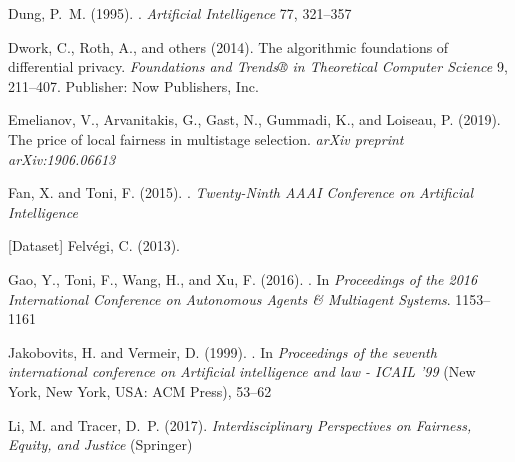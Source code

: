 \documentclass[acmsmall]{custom-arxiv}  %
\begin{document}
\begin{thebibliography}{41}
Dung, P.~M. (1995).
.
\newblock \emph{Artificial Intelligence} 77, 321--357

Dwork, C., Roth, A., and {others} (2014).
\newblock The algorithmic foundations of differential privacy.
\newblock \emph{Foundations and Trends® in Theoretical Computer Science} 9,
  211--407.
\newblock Publisher: Now Publishers, Inc.

Emelianov, V., Arvanitakis, G., Gast, N., Gummadi, K., and Loiseau, P. (2019).
\newblock The price of local fairness in multistage selection.
\newblock \emph{arXiv preprint arXiv:1906.06613}

Fan, X. and Toni, F. (2015).
.
\newblock \emph{Twenty-Ninth AAAI Conference on Artificial Intelligence}

[Dataset] Felv{\'{e}}gi, C. (2013).

Gao, Y., Toni, F., Wang, H., and Xu, F. (2016).
.
\newblock In \emph{Proceedings of the 2016 International Conference on
  Autonomous Agents {\&} Multiagent Systems}. 1153--1161

Jakobovits, H. and Vermeir, D. (1999).
.
\newblock In \emph{Proceedings of the seventh international conference on
  Artificial intelligence and law - ICAIL '99} (New York, New York, USA: ACM
  Press), 53--62

Li, M. and Tracer, D.~P. (2017).
\newblock \emph{Interdisciplinary {Perspectives} on {Fairness}, {Equity}, and
  {Justice}} (Springer)


\end{thebibliography}
\end{document}
